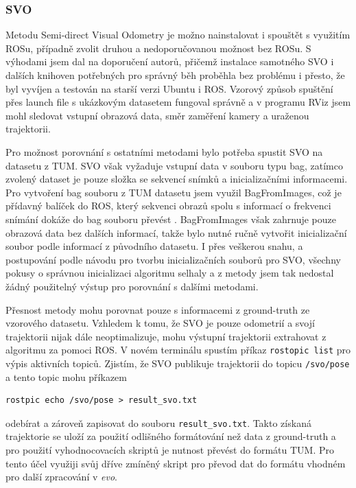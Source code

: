 \documentclass[12pt,a4paper]{article}
\begin{document}
\subsubsection{SVO}
Metodu Semi-direct Visual Odometry je možno nainstalovat i spouštět s využitím ROSu, případně zvolit druhou a nedoporučovanou možnost bez ROSu. S výhodami jsem dal na doporučení autorů, přičemž instalace samotného SVO i dalších knihoven potřebných pro správný běh proběhla bez problému i přesto, že byl vyvíjen a testován na starší verzi Ubuntu i ROS. Vzorový způsob spuštění přes launch file s ukázkovým datasetem fungoval správně a v programu RViz jsem mohl sledovat vstupní obrazová data, směr zaměření kamery a uraženou trajektorii. 

Pro možnost porovnání s ostatními metodami bylo potřeba spustit SVO na datasetu z TUM. SVO však vyžaduje vstupní data v souboru typu bag, zatímco zvolený dataset je pouze složka se sekvencí snímků a inicializačními informacemi. Pro vytvoření bag souboru z TUM datasetu jsem využil BagFromImages, což je přídavný balíček do ROS, který sekvenci obrazů spolu s informací o frekvenci snímání dokáže do bag souboru převést \cite{BagFromImages}. BagFromImages však zahrnuje pouze obrazová data bez dalších informací, takže bylo nutné ručně vytvořit inicializační soubor podle informací z původního datasetu. I přes veškerou snahu, a postupování podle návodu pro tvorbu inicializačních souborů pro SVO, všechny pokusy o správnou inicializaci algoritmu selhaly a z metody jsem tak nedostal žádný použitelný výstup pro porovnání s dalšími metodami.

Přesnost metody mohu porovnat pouze s informacemi z ground-truth ze vzorového datasetu. Vzhledem k tomu, že SVO je pouze odometrií a svojí trajektorii nijak dále neoptimalizuje, mohu výstupní trajektorii extrahovat z algoritmu za pomoci ROS. V novém terminálu spustím příkaz \texttt{rostopic list} pro výpis aktivních topiců. Zjistím, že SVO publikuje trajektorii do topicu \texttt{/svo/pose} a tento topic mohu příkazem 
\begin{verbatim}
rostpic echo /svo/pose > result_svo.txt
\end{verbatim}
 odebírat a zároveň zapisovat do souboru \texttt{result\_svo.txt}. Takto získaná trajektorie se uloží za použití odlišného formátování než data z ground-truth a pro použití vyhodnocovacích skriptů je nutnost převést do formátu TUM. Pro tento účel využiji svůj dříve zmíněný skript pro převod dat do formátu vhodném pro další zpracování v \textit{evo}.
\end{document}

